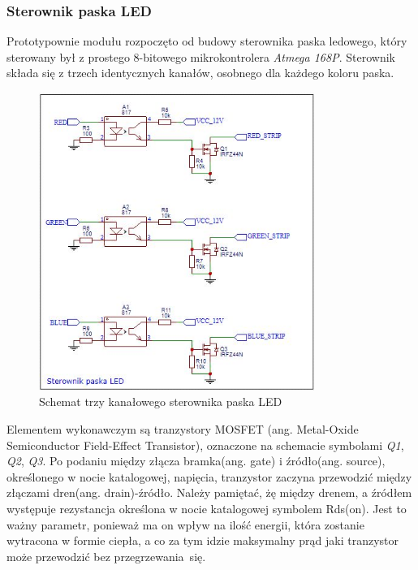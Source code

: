 \documentclass[12pt, eng, twoside, openany, final]{mgr}
\begin{document}
            \subsubsection{Sterownik paska LED}
                Prototypownie modułu rozpoczęto od budowy sterownika paska ledowego, który sterowany był z prostego 8-bitowego mikrokontrolera \emph{Atmega 168P}. 
                Sterownik składa się z trzech identycznych kanałów, osobnego dla każdego koloru paska. 
                \begin{figure}[H]
                \begin{center}
                    \includegraphics[width=0.8\textwidth]{sterownik1.jpg}
                    \caption{Schemat trzy kanałowego sterownika paska LED}
                \end{center}
                \end{figure}
                Elementem wykonawczym są tranzystory MOSFET (ang. Metal-Oxide Semiconductor Field-Effect Transistor), oznaczone na schemacie symbolami \emph{Q1}, \emph{Q2}, \emph{Q3}. Po podaniu między złącza bramka(ang. gate) i źródło(ang. source), określonego w nocie katalogowej\cite{irfz44nData}, napięcia, tranzystor zaczyna przewodzić między złączami dren(ang. drain)-źródło. Należy pamiętać, żę między drenem, a źródłem występuje rezystancja określona w nocie katalogowej symbolem Rds(on). Jest to ważny parametr, ponieważ ma on wpływ na ilość energii, która zostanie wytracona w formie ciepła, a co za tym idzie maksymalny prąd jaki tranzystor może przewodzić bez przegrzewania~się.
\end{document}
